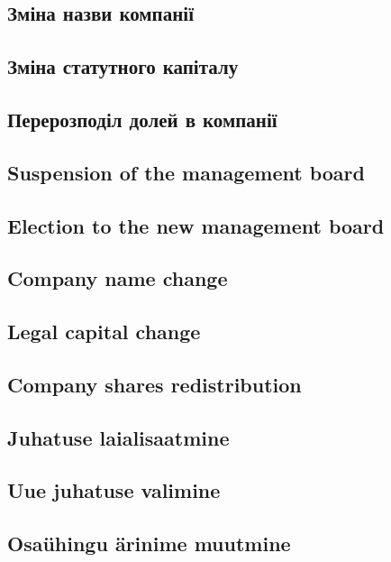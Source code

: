 \begin{Form}
\begin{paracol}{3}
{          \subsection{Зміна назви компанії}
          \subsection{Зміна статутного капіталу}
          \subsection{Перерозподіл долей в компанії}
        }
        { \subsection{Suspension of the management board}
          \subsection{Election to the new management board}
          \subsection{Company name change}
          \subsection{Legal capital change}
          \subsection{Company shares redistribution}
        }
        { \subsection{Juhatuse laialisaatmine}
          \subsection{Uue juhatuse valimine}
          \subsection{Osaühingu ärinime muutmine}
}
\end{paracol}
\end{Form}
